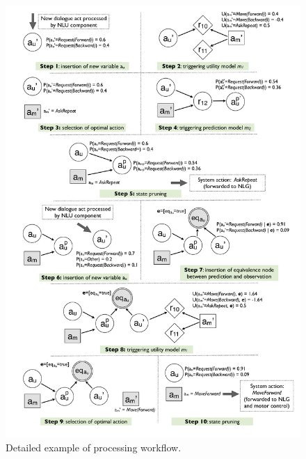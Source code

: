 \begin{figure}[p]
\centering
\includegraphics[scale=0.238]{imgs/detailedexample.pdf}
\caption{Detailed example of processing workflow. }
\label{fig:detailedexample}
\end{figure}
 
